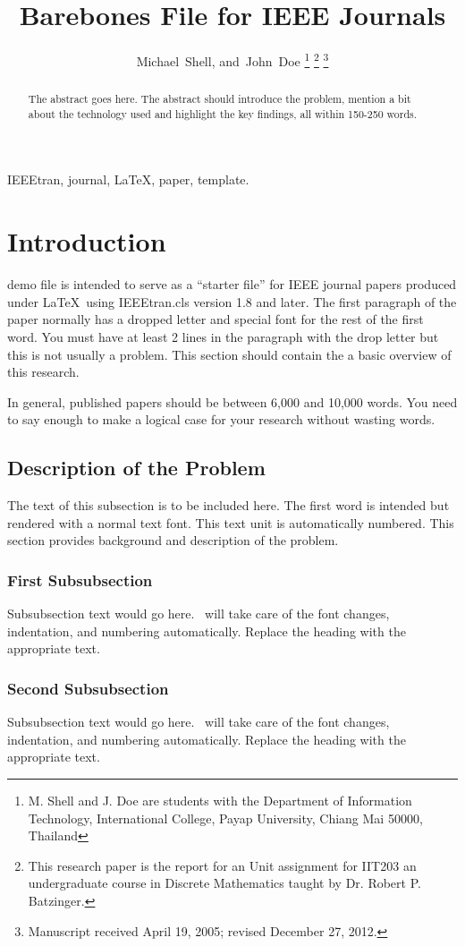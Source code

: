 \documentclass[journal,12pt]{IEEEtran}
\title{Barebones File for IEEE Journals}
\author{Michael~Shell,
        and~John~Doe%
\thanks{M. Shell and J. Doe are students with the Department of Information Technology, International College, Payap University, Chiang Mai 50000, Thailand}%
\thanks{This research paper is the report for an Unit assignment for IIT203 an undergraduate course in Discrete Mathematics taught by Dr. Robert P. Batzinger.}%
\thanks{Manuscript received April 19, 2005; revised December 27, 2012.}}
\begin{document}
\maketitle

\begin{abstract}
The abstract goes here. The abstract should introduce the problem, mention a bit about the technology used and highlight the key findings, all within 150-250 words.
\end{abstract}

\begin{IEEEkeywords}
IEEEtran, journal, \LaTeX, paper, template.
\end{IEEEkeywords}

\section{Introduction}

 demo file is intended to serve as a ``starter file''
for IEEE journal papers produced under \LaTeX\ using
IEEEtran.cls version 1.8 and later. The first paragraph of the paper normally has a dropped letter and special font for the rest of the first word.
You must have at least 2 lines in the paragraph with the drop letter but this is not usually a problem. This section should contain the a basic overview of this research.\cite{Kopka:2003}

In general, published papers should be between 6,000 and 10,000 words. You need to say enough to make a logical case for your research without wasting words. 

\subsection{Description of the Problem}
The text of this subsection is to be included here. The first word is intended but rendered with a normal text font. This text unit is automatically numbered. This section provides background and description of the problem. 

\subsubsection{First Subsubsection}
Subsubsection text would go here. \LaTeXe\ will take care of the font changes, indentation, and numbering automatically. Replace the heading with the appropriate text.

\subsubsection{Second Subsubsection}
Subsubsection text would go here. \LaTeXe\ will take care of the font changes, indentation, and numbering automatically. Replace the heading with the appropriate text.
\end{document}
